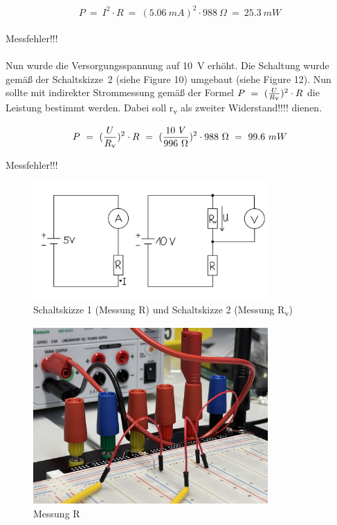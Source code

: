 \documentclass[a4paper,12pt]{article}
\begin{document}
\[
P ~=~ I^2 \cdot R ~=~ (5.06~mA)^2 \cdot 988~\Omega ~=~ 25.3~mW
\]\\

\noindent Messfehler!!!\\\\
Nun wurde die Versorgungsspannung auf 10~V erhöht. Die Schaltung wurde gemäß der Schaltskizze~2 (siehe Figure 10) umgebaut (siehe Figure 12). Nun sollte mit indirekter Strommessung gemäß der Formel \(P ~=~  (\frac{U}{R\textsubscript{v}})^2 \cdot R\) die Leistung bestimmt werden. Dabei soll r\textsubscript{v} als zweiter Widerstand!!!! dienen.

\[
P ~=~  (\frac{U}{R\textsubscript{v}})^2 \cdot R ~=~ (\frac{10~V}{996~\Omega})^2 \cdot 988~\Omega ~=~ 99.6~mW
\]

\noindent Messfehler!!!

\begin{figure}[H]
    \centering
    \includegraphics[width=0.8\textwidth]{../Quellen/Labor2/Schaltskizzen Widerstandsmessung.jpeg}
\caption{Schaltskizze 1 (Messung R) und Schaltskizze 2 (Messung R\textsubscript{v})}
\end{figure}



\begin{figure}[H]
    \centering
    \includegraphics[width=0.8\textwidth]{../Quellen/Labor2/Fotos/IMG_3979.jpeg}
\caption{Messung R}
\end{figure}
\end{document}
